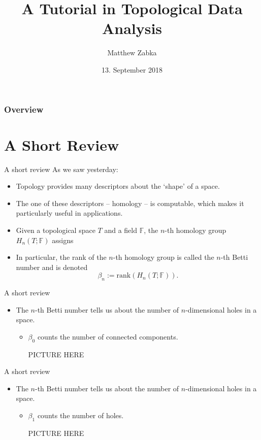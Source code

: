 \documentclass[handout]{beamer}
\title{A Tutorial in Topological Data Analysis} %
\author{Matthew Zabka}
\institute[SMSU] %
{
}
\date{13. September 2018} %
\begin{document}
\begin{frame}
\titlepage %
\end{frame}

\begin{frame}
\frametitle{Overview} %
\tableofcontents 
\end{frame}

\section{A Short Review}
\begin{frame}{A short review}
As we saw yesterday:
\begin{itemize}
\item<2-> Topology provides many descriptors about the `shape' of a space.
\item<3-> The one of these descriptors -- homology -- is computable, which makes it particularly useful in applications.
\item<4-> Given a topological space $T$ and a field $\mathbb{F}$, the $n$-th homology group $H_n(T;\mathbb{F})$ assigns 
\item<5-> In particular, the rank of the $n$-th homology group is called the $n$-th Betti number and is denoted
	\[
	\beta_n := \textrm{rank}(H_n(T;\mathbb{F})).
	\]
\end{itemize}
\end{frame}
\begin{frame}{A short review}
\begin{itemize}
\item The $n$-th Betti number tells us about the number of $n$-dimensional holes in a space.
	\begin{itemize}
	\item<2-> $\beta_0$ counts the number of connected components.
	
	PICTURE HERE
	\end{itemize}
\end{itemize}
\end{frame}
\begin{frame}{A short review}
\begin{itemize}
\item The $n$-th Betti number tells us about the number of $n$-dimensional holes in a space.
	\begin{itemize}
	\item<2-> $\beta_1$ counts the number of holes.
	
	PICTURE HERE
	\end{itemize}
\end{itemize}
\end{frame}
\end{document}
